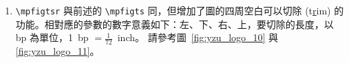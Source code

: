 \begin{enumerate}
{\centering\begin{lstlisting}[caption={mpfigts 使用範例碼},
label=lst:mpfigts,
numbers=left,
firstnumber=1,
frame=ltrb, % single lines for left, top, right, bottom; LTRB for double lines 
%escapeinside={$$}, %如要在列表裡顯示特殊字元/排版效果，要把該文字串用 $$ 包夾住 (適合 C 程式碼)(原預設為 <>)
]
\begin{figure}[tbph]
%
\mpfigts{0.35} %width in terms of \columnwidth
{figs/example_fig} %path/filename (no space)
{<使用 mpfigts 展示較大的與標題文字間距>} %caption
{fig:yzu_logo_8} %label
{<原圖擷取自元智大學網頁>} %additional text beneath the caption
{-1ex} %place negative height, say, -4ex to reduce the gap between fig and caption
%
\hfill
%
\mpfigts{0.35} %width in terms of \columnwidth
{figs/example_fig} %path/filename (no space)
{<使用 mpfigts 展示調整較小的與標題文字間距>} %caption
{fig:yzu_logo_9} %label
{<原圖擷取自元智大學網頁>} %additional text beneath the caption
{-4ex} %place negative height, say, -4ex to reduce the gap between fig and caption
%
\end{figure}
\end{lstlisting}\par}

%
\begin{figure}[tbph]
%
{figs/example_fig} %
{使用 mpfigts 展示較大的與標題文字間距} %
{fig:yzu_logo_8} %
{原圖擷取自元智大學網頁} %
{-1ex} %
%
\hfill
%
{figs/example_fig} %
{使用 mpfigts 展示調整較小的與標題文字間距} %
{fig:yzu_logo_9} %
{原圖擷取自元智大學網頁} %
{-4ex} %
%
\end{figure}

\item \verb+\mpfigtsr+ 與前述的 \verb+\mpfigts+ 同，但增加了圖的四周空白可以切除 (t\uline{r}im) 的功能。相對應的參數的數字意義如下：左、下、右、上，要切除的長度，以 bp 為單位，1~bp $= \frac{1}{72}$~inch。
請參考圖~\ref{fig:yzu_logo_10} 與 \ref{fig:yzu_logo_11}。


\end{enumerate}
